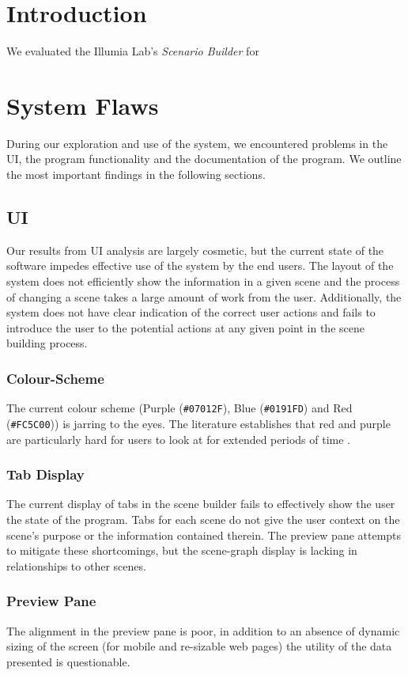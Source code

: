 \documentclass[sigconf]{acmart}
\begin{document}
\section{Introduction}
We evaluated the Illumia Lab's \textit{Scenario Builder} for
\section{System Flaws}
During our exploration and use of the system, we encountered problems in the UI, the program functionality and the documentation of the program. We outline the most important findings in the following sections.
\subsection{UI}
Our results from UI analysis are largely cosmetic, but the current state of the software impedes effective use of the system by the end users. The layout of the system does not efficiently show the information in a given scene and the process of changing a scene takes a large amount of work from the user. Additionally, the system does not have clear indication of the correct user actions and fails to introduce the user to the potential actions at any given point in the scene building process.

\subsubsection{Colour-Scheme}
The current colour scheme (Purple (\verb|#07012F|), Blue (\verb|#0191FD|) and Red (\verb|#FC5C00|)) is jarring to the eyes. The literature establishes that red and purple are particularly hard for users to look at for extended periods of time \cite{jonesHumancomputerInteractionDesign1989}.

\subsubsection{Tab Display}
The current display of tabs in the scene builder fails to effectively show the user the state of the program. Tabs for each scene do not give the user context on the scene's purpose or the information contained therein. The preview pane attempts to mitigate these shortcomings, but the scene-graph display is lacking in relationships to other scenes.

\subsubsection{Preview Pane}
The alignment in the preview pane is poor, in addition to an absence of dynamic sizing of the screen (for mobile and re-sizable web pages) the utility of the data presented is questionable.
\end{document}
